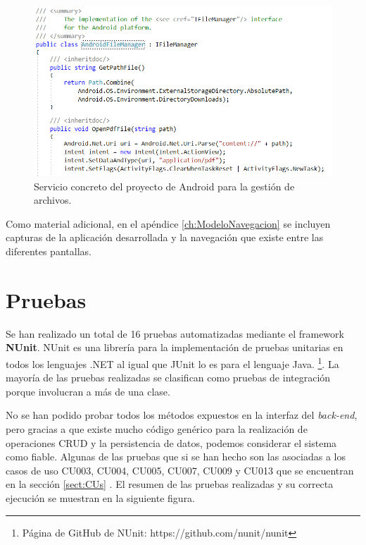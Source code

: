 \documentclass[11pt,spanish,listoffigures]{tfgetsinf}
\begin{document}
\begin{itemize}
\begin{figure}[h]
\centering
\includegraphics[scale=0.8]{AndroidFileManager}
\caption{Servicio concreto del proyecto de Android para la gestión de archivos.}
\label{fig:AndroidFileManager}
\end{figure}

\end{itemize}

Como material adicional, en el apéndice \ref{ch:ModeloNavegacion}  se incluyen capturas de la aplicación desarrollada y la navegación que existe entre las diferentes pantallas.

\section{Pruebas} \label{sect:MonoPruebas}

Se han realizado un total de 16 pruebas automatizadas mediante el framework \textbf{NUnit}. NUnit es una librería para la implementación de pruebas unitarias en todos los lenguajes .NET al igual que JUnit lo es para el lenguaje Java. \footnote{ Página de GitHub de NUnit: https://github.com/nunit/nunit}. La mayoría de las pruebas realizadas se clasifican como pruebas de integración porque involucran a más de una clase. 

No se han podido probar todos los métodos expuestos en la interfaz del \textit{back-end}, pero gracias a que existe mucho código genérico para la realización de operaciones CRUD y la persistencia de datos, podemos considerar el sistema como fiable. Algunas de las pruebas que si se han hecho son las asociadas a los casos de uso CU003, CU004, CU005, CU007, CU009 y CU013 que se encuentran en la sección \ref{sect:CUs} . El resumen de las pruebas realizadas y su correcta ejecución se muestran en la siguiente figura.
\end{document}
